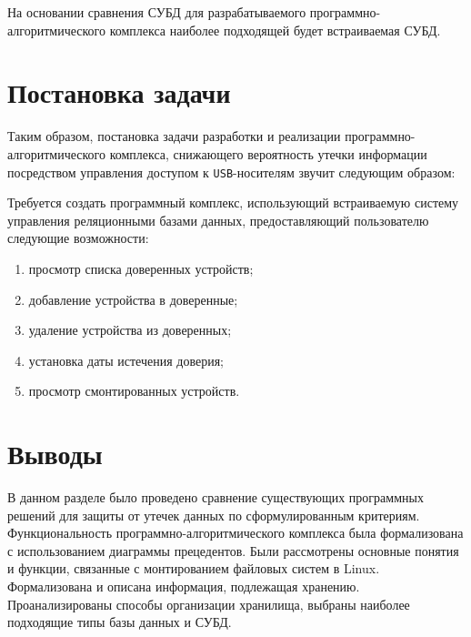 На основании сравнения СУБД для разрабатываемого программно-алгоритмического комплекса
наиболее подходящей будет встраиваемая СУБД.

\section{Постановка задачи}

Таким образом, постановка задачи разработки и реализации программно-алгоритмического
комплекса, снижающего вероятность утечки информации посредством управления доступом к \texttt{USB}-носителям
звучит следующим образом:

Требуется создать программный комплекс, использующий встраиваемую систему управления реляционными базами данных,
предоставляющий пользователю следующие возможности:

\begin{enumerate}
    \item просмотр списка доверенных устройств;
    \item добавление устройства в доверенные;
    \item удаление устройства из доверенных;
    \item установка даты истечения доверия;
    \item просмотр смонтированных устройств.
\end{enumerate}

\section{Выводы}

В данном разделе было проведено сравнение существующих программных решений для защиты от утечек данных 
по сформулированным критериям. Функциональность программно-алгоритмического комплекса была формализована
с использованием диаграммы прецедентов. Были рассмотрены основные понятия и функции, связанные с монтированием
файловых систем в Linux. Формализована и описана информация, подлежащая хранению.
Проанализированы способы организации хранилища, выбраны наиболее подходящие типы базы данных и СУБД.